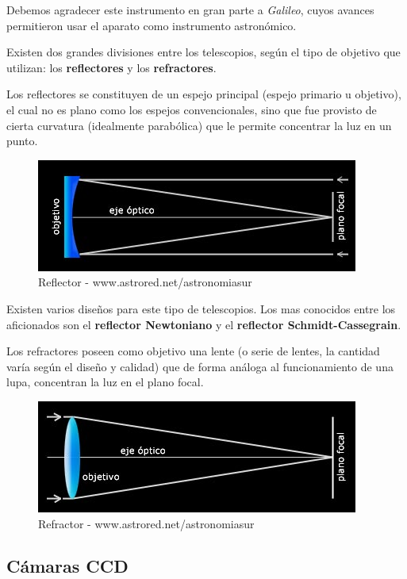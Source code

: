 \bigskip
Debemos agradecer este instrumento en gran parte a \textit{Galileo}, cuyos avances permitieron usar el aparato como instrumento astronómico. 

\bigskip
Existen dos grandes divisiones entre los telescopios, según el tipo de objetivo que utilizan: los \textbf{reflectores} y los \textbf{refractores}. 

\bigskip
Los reflectores se constituyen de un espejo principal (espejo primario u objetivo), el cual no es plano como los espejos convencionales, sino que fue provisto de cierta curvatura (idealmente parabólica) que le permite concentrar la luz en un punto.

\begin{figure}[h]
	\centering
	\includegraphics[width=0.7\linewidth]{../images/refrector}
	\caption[Telescopio]{Reflector - www.astrored.net/astronomiasur}
	\label{fig:refrector}
\end{figure}

Existen varios diseños para este tipo de telescopios. Los mas conocidos entre los aficionados son el \textbf{reflector Newtoniano} y el \textbf{reflector Schmidt-Cassegrain}. 


\bigskip
Los refractores poseen como objetivo una lente (o serie de lentes, la cantidad varía según el diseño y calidad) que de forma análoga al funcionamiento de una lupa, concentran la luz en el plano focal. 


\begin{figure}[h]
	\centering
	\includegraphics[width=0.7\linewidth]{../images/refractor}
		\caption[Telescopio]{Refractor -  www.astrored.net/astronomiasur }
	\label{fig:refrector}
\end{figure}



\subsection{Cámaras CCD}

